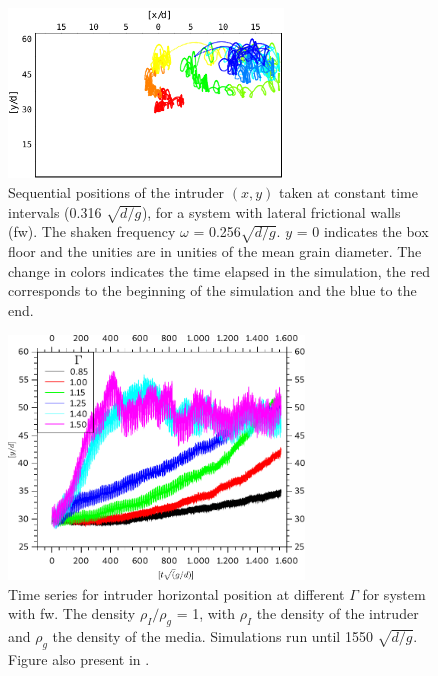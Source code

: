 \begin{figure}[H]
    \centering
    \includegraphics[width=0.65\textwidth]{04-figuras/BNE_PositionWalls.pdf}
    \caption[BNE with walls: sample of intruder positions.]{Sequential positions of the intruder $(x, y)$ taken at constant time intervals (0.316 $\sqrt{d/g}$), for a system with lateral frictional walls (fw). The shaken frequency $\omega$ = 0.256$\sqrt{d/g}$. $y$ = 0 indicates the box floor and the unities are in unities of the mean grain diameter. The change in colors indicates the time elapsed in the simulation, the red corresponds to the beginning of the simulation and the blue to the end.}
    \label{fig:BNE_intruderwalls}
\end{figure}

\begin{figure}[H]
    \centering
    \includegraphics[width=0.7\textwidth]{04-figuras/BNE25000D1.pdf}
    \caption[BNE with frictional walls: $\rho_I/\rho_g$ = 1.]{Time series for intruder horizontal position at different $\Gamma$ for system with fw. The density $\rho_I/\rho_g$ = 1, with $\rho_I$ the density of the intruder and $\rho_g$ the density of the media. Simulations run until 1550 $\sqrt{d/g}$. Figure also present in \cite{Large-deviation_quantification_of_boundary_conditions_on_the_Brazil_nut_effect}.}
    \label{fig:BNE25000_Parede}
\end{figure}


